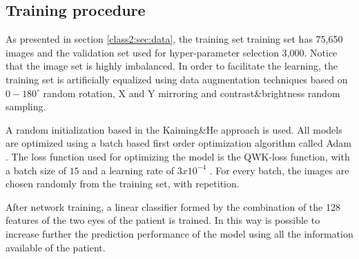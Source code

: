 \subsection{Training procedure}

As presented in section \ref{class2:sec:data}, the training set training set has 75,650 images and the validation set used for hyper-parameter selection 3,000. Notice that the image set is highly imbalanced. In order to facilitate the learning, the training set is artificially equalized using data augmentation techniques \citep{Krizhevsky:2012} based on $0-180^{\circ}$ random rotation, X and Y mirroring and contrast\&brightness random sampling.

A random initialization based in the Kaiming\&He approach \citep{kaiming} is used. All models are optimized using a batch based first order optimization algorithm called Adam \citep{DBLP:journals/corr/KingmaB14}. The loss function used for optimizing the model is the QWK-loss function, with a batch size of $15$ and a learning rate of $3x10^{-4}$ \citep{delatorre2017}. For every batch, the images are chosen randomly from the training set, with repetition. 

After network training, a linear classifier formed by the combination of the 128 features of the two eyes of the patient is trained. In this way is possible to increase further the prediction performance of the model using all the information available of the patient.

